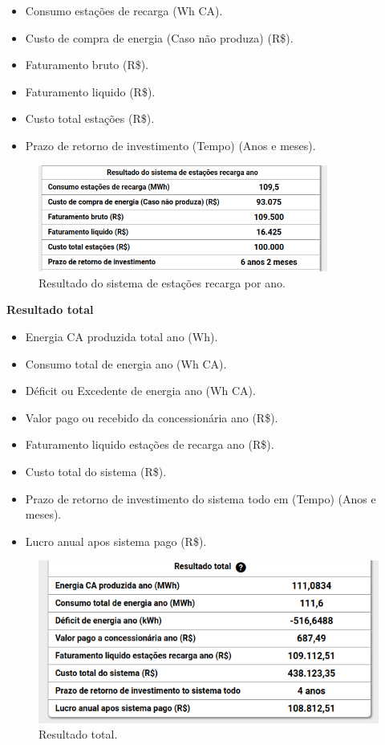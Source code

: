 \begin{itemize}
   \item Consumo estações de recarga (Wh CA).
   \item Custo de compra de energia (Caso não produza) (R\$).
   \item Faturamento bruto (R\$).
   \item Faturamento liquido (R\$).
   \item Custo total estações (R\$).
   \item Prazo de retorno de investimento (Tempo) (Anos e meses).
\end{itemize}

\begin{figure}[H]
    \centering
    \includegraphics[width=0.85\textwidth]{./Figuras/Resultados_number_2.png}
    \caption{Resultado do sistema de estações recarga por ano.}
   \label{fig:Resultados_number_2}
\end{figure}

\newpage
\textbf{Resultado total}

\begin{itemize}
   \item Energia CA produzida total ano (Wh).
   \item Consumo total de energia ano (Wh CA).
   \item Déficit ou Excedente de energia ano (Wh CA).
   \item Valor pago ou recebido da concessionária ano (R\$).
   \item Faturamento liquido estações de recarga ano (R\$).
   \item Custo total do sistema (R\$).
   \item Prazo de retorno de investimento do sistema todo em (Tempo) (Anos e meses).
   \item Lucro anual apos sistema pago (R\$).
\end{itemize}

\begin{figure}[H]
    \centering
    \includegraphics[width=1\textwidth]{./Figuras/Resultados_number_3.png}
    \caption{Resultado total.}
   \label{fig:Resultados_number_3}
\end{figure}

